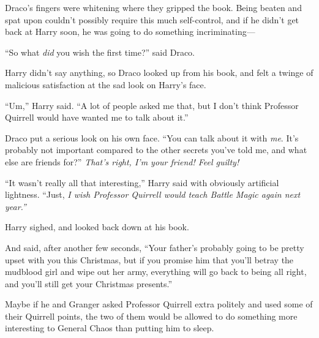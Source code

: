 Draco's fingers were whitening where they gripped the book. Being beaten
and spat upon couldn't possibly require this much self-control, and if
he didn't get back at Harry soon, he was going to do something
incriminating---

``So what \emph{did} you wish the first time?'' said Draco.

Harry didn't say anything, so Draco looked up from his book, and felt a
twinge of malicious satisfaction at the sad look on Harry's face.

``Um,'' Harry said. ``A lot of people asked me that, but I don't think
Professor Quirrell would have wanted me to talk about it.''

Draco put a serious look on his own face. ``You can talk about it with
\emph{me}. It's probably not important compared to the other secrets
you've told me, and what else are friends for?'' \emph{That's right, I'm
your friend! Feel guilty!}

``It wasn't really all that interesting,'' Harry said with obviously
artificial lightness. ``Just, \emph{I wish Professor Quirrell would
teach Battle Magic again next year.''}

Harry sighed, and looked back down at his book.

And said, after another few seconds, ``Your father's probably going to
be pretty upset with you this Christmas, but if you promise him that
you'll betray the mudblood girl and wipe out her army, everything will
go back to being all right, and you'll still get your Christmas
presents.''

Maybe if he and Granger asked Professor Quirrell extra politely and used
some of their Quirrell points, the two of them would be allowed to do
something more interesting to General Chaos than putting him to sleep.
